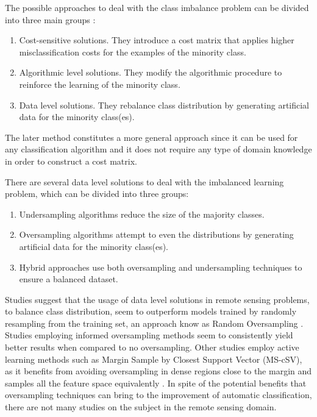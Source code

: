 \documentclass[remotesensing,article,submit,moreauthors,pdftex]{Definitions/mdpi}
\begin{document}
The possible approaches to deal with the class imbalance problem can be divided into three main
groups \cite{Fernandez2013}:

\begin{enumerate}

	\item Cost-sensitive solutions. They introduce a cost matrix that applies
	higher misclassification costs for the examples of the minority class.

	\item Algorithmic level solutions. They modify the algorithmic procedure to
	reinforce the learning of the minority class.

	\item Data level solutions. They rebalance class distribution by generating
	artificial data for the minority class(es).

\end{enumerate}

The later method constitutes a more general approach since it can be used for
any classification algorithm and it does not require any type of domain
knowledge in order to construct a cost matrix.

There are several data level solutions to deal with the imbalanced learning
problem, which can be divided into three groups:

\begin{enumerate}

	\item Undersampling algorithms reduce the size of the majority classes.

	\item Oversampling algorithms attempt to even the distributions by
	generating artificial data for the minority class(es).

	\item Hybrid approaches use both oversampling and undersampling techniques
	to ensure a balanced dataset.

\end{enumerate}

Studies suggest that the usage of data level solutions in remote sensing
problems, to balance class distribution, seem to outperform models trained by
randomly resampling from the training set, an approach know as Random
Oversampling \cite{Wang2019, Mellor2015}.  Studies employing informed
oversampling methods seem to consistently yield better results
\cite{Johnson2013, Geib2015} when compared to no oversampling. Other studies
employ active learning methods such as Margin Sample by Closest Support Vector
(MS-cSV), as it benefits from avoiding oversampling in dense regions close to
the margin and samples all the feature space equivalently \cite{Tuia2009}. In
spite of the potential benefits that oversampling techniques can bring to the
improvement of automatic classification, there are not many studies on the
subject in the remote sensing domain.
\end{document}
